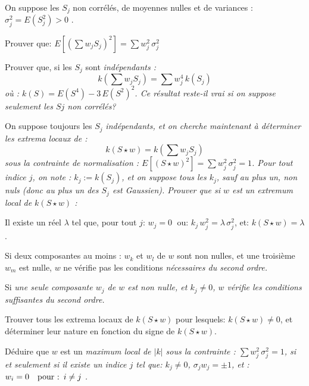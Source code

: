 \documentclass[12pt,a4paper,fleqn]{report}
\newcommand{\on}{\begin{displaymath}}
\newcommand{\off}{\end{displaymath}}
\newcommand{\push}[1]{\rule{0pt}{0pt}\hspace{#1pt}}
\begin{document}
\begin{exercice}
On suppose les $S_j$ non corrélés, de moyennes nulles et de variances :  $\sigma_j^2=E(S_j^2)>0$ .
\begin{questions}
\item  Prouver que: $E\left[\left(\sum w_jS_j\right)^2\right]=\sum w_j^2\, \sigma_j^2$
\item  Prouver que, si les $S_j$ sont  \it indépendants \rm : 
\on k(\sum w_jS_j)=\sum w_j^4\, k(S_j) \off
où : $k(S)=E(S^4)-3\,E(S^2)^2$. Ce résultat reste-il vrai si on suppose seulement les $Sj$ non corrélés?
\item On suppose toujours les $S_j$ \it indépendants\rm, et on cherche maintenant à déterminer les extrema locaux de :  
\on k(S\star w)=k(\sum w_jS_j) \off
sous la contrainte de normalisation : $E[(S\star w)^2]=\sum w_j^2\,\sigma_j^2=1$.
Pour tout indice $j$, on note : $k_j:=k(S_j)$, et on suppose tous les $k_j$, \it sauf au plus un\rm, non nuls (donc au plus un des $S_j$ est Gaussien).  Prouver que si $w$ est un extremum local de $k(S\star w)$ : 
\begin{subquestions}
\item Il existe un réel $\lambda$ tel que, pour tout $j$:
$ w_j=0\;$  ou:  $ k_j\,w_j^2= \lambda\,\sigma_j^2 $, et:  $k(S\star w)=\lambda$.
\item  Si deux composantes  au moins  : $w_k$ et $w_l$ de $w$ sont  non nulles, et une troisième $w_m$ est nulle, $w$ ne vérifie pas les conditions  \it nécessaires \rm du second ordre.
\item  Si \it une seule \rm  composante $w_j$ de $w$ est non nulle, et $k_j\neq 0$, $w$ vérifie les conditions \it suffisantes \rm du second ordre.
\end{subquestions}
\item Trouver tous les extrema locaux de $k(S\star w)$ pour lesquels: $k(S\star w)\neq 0$, et déterminer  leur nature en fonction du signe de $k(S\star w)$.
\item Déduire que $w$ est un \it maximum \rm  local de $|k|$ sous la contrainte : $\sum w_j^2\,\sigma_j^2=1$, si et seulement si il existe un indice $j$ tel que:  $k_j\neq 0$,
$  \sigma_j w_j=\pm 1$, et : $w_i = 0\push{10}\mbox{pour :}\push 5 i\neq j $ . 
\end{questions}
\end{exercice}

\pagebreak
\end{document}
